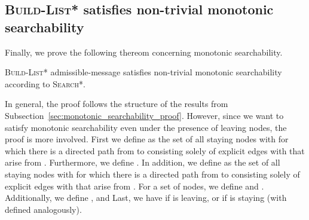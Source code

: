 \documentclass[a4paper,USenglish]{lipics}
\newcommand{\blpp}{\textsc{Build-List*}\xspace}
\newcommand{\srpp}{\textsc{Search*}\xspace}
\begin{document}
\subsection{\blpp satisfies non-trivial monotonic searchability}
\label{sec:blpp_monotonic_searchability_proof}
Finally, we prove the following thereom concerning monotonic searchability.

\begin{theorem}\label{thm:blpp_guarantees_monotonic_searchability}
 \blpp admissible-message satisfies non-trivial monotonic searchability according to \srpp.
\end{theorem}

In general, the proof follows the structure of the results from Subsection~\ref{sec:monotonic_searchability_proof}.
However, since we want to satisfy monotonic searchability even under the presence of leaving nodes, the proof is more involved.
First we define  as the set of all staying nodes  with  for which there is a directed path from  to  consisting solely of explicit edges  with  that arise from .
Furthermore, we define .
In addition, we define  as the set of all staying nodes  with  for which there is a directed path from  to  consisting solely of explicit edges  with  that arise from .
For a set of nodes, we define  and .
Additionally, we define , and 
Last, we have  if  is leaving, or  if  is staying (with  defined analogously).
\end{document}
